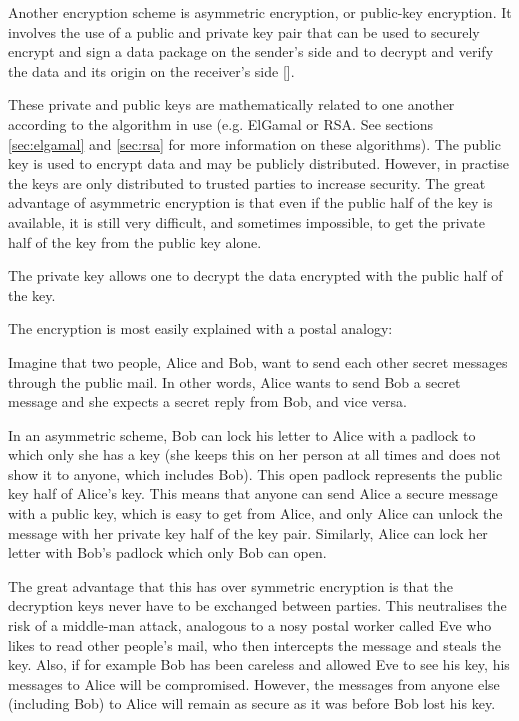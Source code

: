 Another encryption scheme is asymmetric encryption, or public-key
encryption. It involves the use of a public and private key pair that can be
used to securely encrypt and sign a data package on the sender's side and to
decrypt and verify the data and its origin on the receiver's side
[\cite{article:pub-encryption}].

These private and public keys are mathematically related to one another
according to the algorithm in use (e.g. ElGamal or RSA. See sections
\ref{sec:elgamal} and \ref{sec:rsa} for more information on these algorithms).
The public key is used to encrypt data and may be publicly distributed. However,
in practise the keys are only distributed to trusted parties to increase security.
The great advantage of asymmetric encryption is that even if the public half of the key is
available, it is still very difficult, and sometimes impossible, to get the
private half of the key from the public key alone.

The private key allows one to decrypt the data encrypted with the public half of the key.

The encryption is most easily explained with a postal analogy:

Imagine that two people, Alice and Bob, want to send each other secret messages through
the public mail. In other words, Alice wants to send Bob a secret message and she expects
a secret reply from Bob, and vice versa. 

In an asymmetric scheme, Bob can lock his letter to Alice with a padlock to which only she has
a key (she keeps this on her person at all times and does not show it to anyone, which
includes Bob). This open padlock represents the public key half of Alice's key. This
means that anyone can send Alice a secure message with a public key, which is easy to
get from Alice, and only Alice can unlock the message with her private key half of the
key pair. Similarly, Alice can lock her letter with Bob's padlock which only Bob can open.

The great advantage that this has over symmetric encryption is that the decryption keys never
have to be exchanged between parties. This neutralises the risk of a middle-man attack,
analogous to a nosy postal worker called Eve who likes to read other people's
mail, who then intercepts the message and steals the key. Also, if for example Bob has
been careless and allowed Eve to see his key, his messages to Alice will be
compromised. However, the messages from anyone else (including Bob) to Alice
will remain as secure as it was before Bob lost his key.

